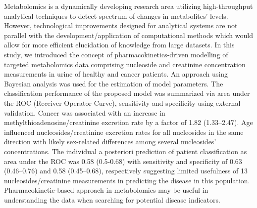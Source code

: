 \documentclass[\main/boa.tex]{subfiles}
\begin{document}
Metabolomics is a dynamically developing research area utilizing
high-throughput analytical techniques to detect spectrum of changes in
metabolites' levels. However, technological improvements designed for
analytical systems are not parallel with the development/application of
computational methods which would allow for more efficient elucidation
of knowledge from large datasets. In this study, we introduced the
concept of pharmacokinetics-driven modelling of targeted metabolomics
data comprising nucleoside and creatinine concentration measurements in
urine of healthy and cancer patients. An approach using Bayesian
analysis was used for the estimation of model parameters. The
classification performance of the proposed model was summarized via area
under the ROC (Receiver-Operator Curve), sensitivity and specificity
using external validation. Cancer was associated with an increase in
methylthioadenosine/creatinine excretion rate by a factor of 1.82
(1.33--2.47). Age influenced nucleosides/creatinine excretion rates for
all nucleosides in the same direction with likely sex-related
differences among several nucleosides' concentrations. The individual a
posteriori prediction of patient classification as area under the ROC
was 0.58 (0.5-0.68) with sensitivity and specificity of 0.63
(0.46--0.76) and 0.58 (0.45--0.68), respectively suggesting limited
usefulness of 13 nucleosides/creatinine measurements in predicting the
disease in this population. Pharmacokinetic-based approach in
metabolomics may be useful in understanding the data when searching for
potential disease indicators.
\end{document}
